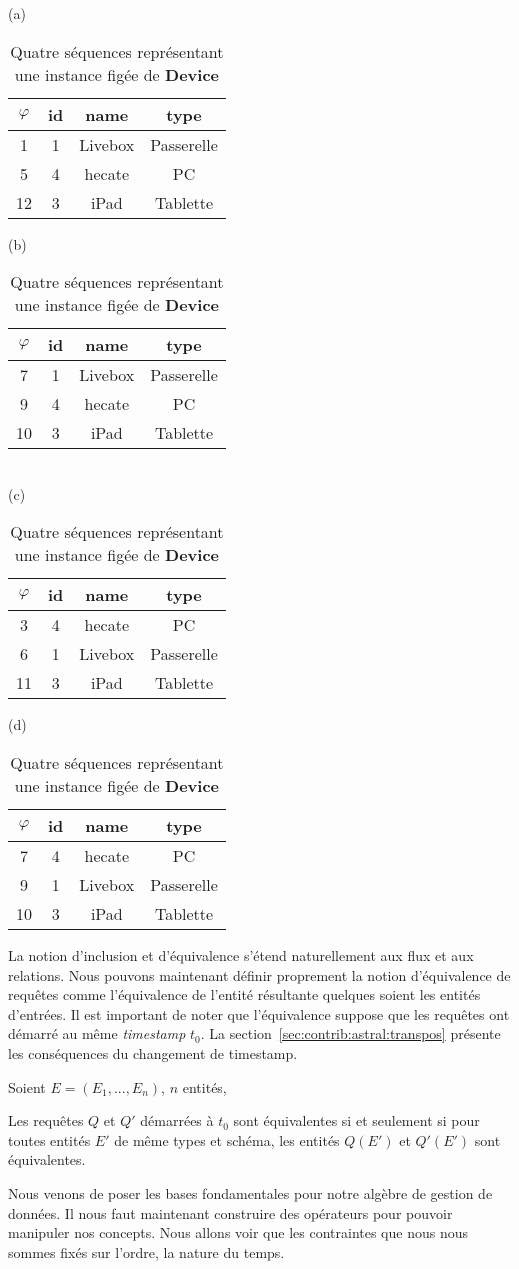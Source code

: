 \begin{table}[ht]
\centering
(a)
\begin{tabular}{c|ccc} 
      $\varphi$ & id & name & type \\ \hline 
       1  & 1 & Livebox & Passerelle \\
       5  & 4 & hecate & PC\\
       12 & 3 & iPad & Tablette\\
\end{tabular}
\hspace{1cm}
(b)
\begin{tabular}{c|ccc} 
      $\varphi$ & id & name & type \\ \hline 
       7  & 1 & Livebox & Passerelle \\
       9  & 4 & hecate & PC\\
       10 & 3 & iPad & Tablette\\
\end{tabular}\\
(c)
\begin{tabular}{c|ccc} 
      $\varphi$ & id & name & type \\ \hline 
       3  & 4 & hecate & PC\\
       6  & 1 & Livebox & Passerelle \\
       11 & 3 & iPad & Tablette\\
\end{tabular}
\hspace{1cm}
(d)
\begin{tabular}{c|ccc} 
      $\varphi$ & id & name & type \\ \hline 
       7  & 4 & hecate & PC\\
       9  & 1 & Livebox & Passerelle \\
       10 & 3 & iPad & Tablette\\
\end{tabular}
\caption{Quatre séquences représentant une instance figée de \textbf{Device}}\label{tab:contrib:astral:exequivalence}
\end{table}

La notion d'inclusion et d'équivalence s'étend naturellement aux flux et aux relations. Nous pouvons maintenant définir proprement la notion d'équivalence de requêtes comme l'équivalence de l'entité résultante quelques soient les entités d'entrées. Il est important de noter que l'équivalence suppose que les requêtes ont démarré au même \textit{timestamp} $t_0$. La section~\ref{sec:contrib:astral:transpos} présente les conséquences du changement de timestamp.
\begin{defi}\label{def:equivalence}
	Soient $E=(E_1, ..., E_n)$, $n$ entités,
	
	Les requêtes $Q$ et $Q'$ démarrées à $t_0$ sont équivalentes si et seulement si pour toutes entités $E'$ de même types et schéma, les entités $Q(E')$ et $Q'(E')$ sont équivalentes.
\end{defi}



Nous venons de poser les bases fondamentales pour notre algèbre de gestion de données. Il nous faut maintenant construire des opérateurs pour pouvoir manipuler nos concepts. Nous allons voir que les contraintes que nous nous sommes fixés sur l'ordre, la nature du temps.
